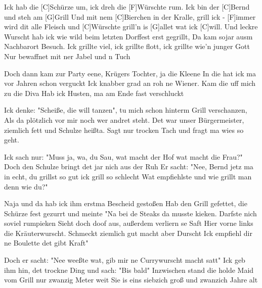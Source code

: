 

\begin{guitar}
	Ick hab die [C]Schürze um, ick dreh die [F]Würschte rum.
	Ick bin der [C]Bernd und steh am [G]Grill
	Und mit nem [C]Bierchen in der Kralle, grill ick - [F]immer wird dit alle
	Fleisch und [C]Würschte grill'n is [G]allet wat ick [C]will.
	\footnotesize	
	Und leckre Wurscht hab ick wie wild beim letzten Dorffest erst gegrillt,
	Da kam sojar ausm Nachbarort Besuch.
	Ick grillte viel, ick grillte flott, ick grillte wie'n junger Gott
	Nur bewaffnet mit ner Jabel und n Tuch
	
	Doch dann kam zur Party eene, Krügers Tochter, ja die Kleene
	In die hat ick ma vor Jahren schon verguckt
	Ick knabber grad an roh ne Wiener. Kam die uff mich zu die Diva
	Hab ick Husten, ma am Ende fast verschluckt
	
	 
	
	Ick denke: "Scheiße, die will tanzen", tu mich schon hinterm Grill verschanzen,
	Als da plötzlich vor mir noch wer andret steht.
	Det war unser Bürgermeister, ziemlich fett und Schulze heißta.
	Sagt nur trocken Tach und fragt ma wies so geht.
	
	Ick sach nur: "Muss ja, wa, du Sau, wat macht der Hof wat macht die Frau?"
	Doch den Schulze bringt det jar nich aus der Ruh
	Er sacht: "Nee, Bernd jetz ma in echt, du grillst so gut ick grill so schlecht
	Wat empfiehlste und wie grillt man denn wie du?"
	
	 
	
	Naja und da hab ick ihm erstma Bescheid gestoßen
	Hab den Grill gefettet, die Schürze fest gezurrt und meinte
	"Na bei de Steaks da musste kieken. Darfste nich soviel rumpieken
	Sieht doch doof aus, außerdem verliern se Saft
	Hier vorne links die Kräuterwurscht. Schmeckt ziemlich gut macht aber Durscht
	Ick empfiehl dir ne Boulette det gibt Kraft"
	
	Doch er sacht: "Nee weeßte wat, gib mir ne Currywurscht macht satt"
	Ick geb ihm hin, det trockne Ding und sach: "Bis bald"
	Inzwischen stand die holde Maid vom Grill nur zwanzig Meter weit
	Sie is eins siebzich groß und zwanzich Jahre alt
	
	 
	

\end{guitar}
